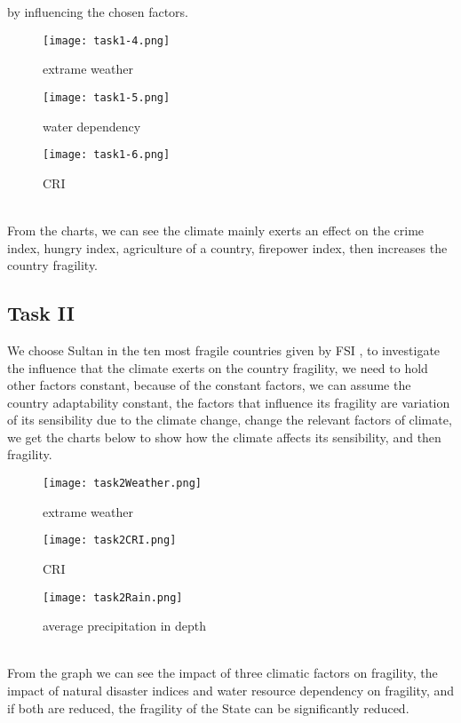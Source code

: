 \documentclass{mcmthesis}
\begin{document}
by influencing the chosen factors.
\begin{figure}[h]
  \centering
  \begin{minipage}[h]{0.3\textwidth}
  \centering
  \texttt{[image: task1-4.png]}
  \caption{extrame weather}
  \end{minipage}
  \begin{minipage}[h]{0.3\textwidth}
  \centering
  \texttt{[image: task1-5.png]}
  \caption{water dependency}
  \end{minipage}    
  \begin{minipage}[h]{0.3\textwidth}
  \centering
  \texttt{[image: task1-6.png]}
  \caption{CRI}
  \end{minipage}  
\end{figure}\\
From the charts, we can see the climate mainly exerts 
an effect on the crime index, hungry index, agriculture of 
a country, firepower index, then increases the 
country fragility.
\subsection{Task II}
We choose Sultan in the ten most fragile countries given by FSI , 
to investigate the influence that the climate exerts on the country fragility, 
we need to hold other factors constant, because of the constant factors, 
we can assume the country adaptability constant, the factors that influence 
its fragility are variation of its sensibility due to the climate change, 
change the relevant factors of climate, we get the charts below to show 
how the climate affects its sensibility, and then fragility.
\begin{figure}[h]
  \begin{minipage}[h]{0.48\textwidth}
  \flushleft
  \texttt{[image: task2Weather.png]}
  \caption{extrame weather}
  \end{minipage}
  \begin{minipage}[h]{0.48\textwidth}
  \flushright
  \texttt{[image: task2CRI.png]}
  \caption{CRI}
  \end{minipage} 
\end{figure}
\begin{figure}[h]
  \begin{minipage}[h]{0.50\textwidth}
  \flushleft
  \texttt{[image: task2Rain.png]}
  \caption{average precipitation in depth}
  \end{minipage}
\end{figure} \\
From the graph we can see the impact of three climatic factors on fragility, 
the impact of natural disaster indices and water resource dependency on fragility, 
and if both are reduced, the fragility of the State can be significantly reduced.
\end{document}
